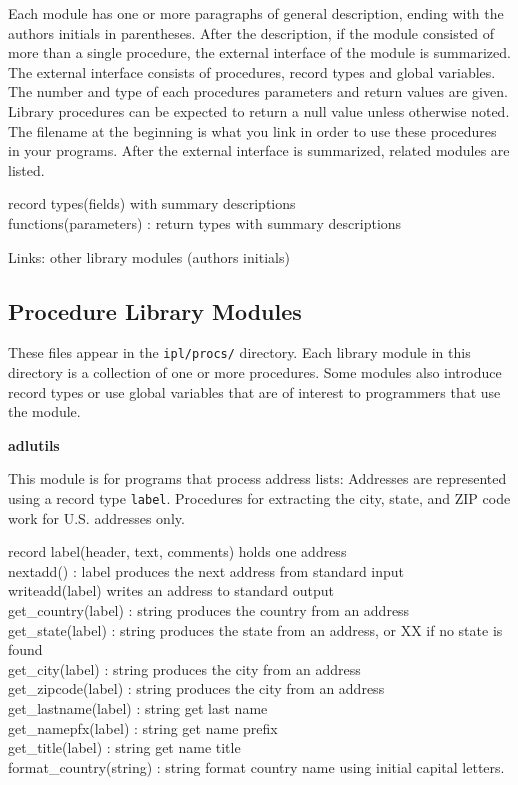 Each module has one or more paragraphs of general description, ending
with the authors{\textquotesingle} initials in parentheses. After the
description, if the module consisted of more than a single procedure,
the external interface of the module is summarized. The external
interface consists of procedures, record types and global variables.
The number and type of each procedure{\textquotesingle}s parameters and
return values are given. Library procedures can be expected to return a
null value unless otherwise noted. The filename at the beginning is
what you link in order to use these procedures in your
programs. After the external interface is summarized, related modules
are listed.

record types(fields) with summary descriptions\\
functions(parameters) : return types with summary descriptions

Links: other library modules (author{\textquotesingle}s initials)

\subsection{Procedure Library Modules}

These files appear in the \texttt{ipl/procs/} directory. Each library
module in this directory is a collection of one or more procedures.
Some modules also introduce record types or use global variables that
are of interest to programmers that use the module.

{\sffamily\bfseries
adlutils}

This module is for programs that process address lists: Addresses are
represented using a record type \texttt{label}. Procedures for
extracting the city, state, and ZIP code work for U.S. addresses only.

\textsf{record label(header, text, comments)} holds one address\\
\textsf{nextadd() : label} produces the next address from standard
input\\
\textsf{writeadd(label)} writes an address to standard output\\
\textsf{get\_country(label) : string} produces the country from an
address\\
\textsf{get\_state(label) : string} produces the state from an address,
or \textsf{{\textquotedbl}XX{\textquotedbl}} if no state is
found\\
\textsf{get\_city(label) : string} produces the city from an
address\\
\textsf{get\_zipcode(label) : string} produces the city from an
address\\
\textsf{get\_lastname(label) : string} get last name\\
\textsf{get\_namepfx(label) : string} get name prefix\\
\textsf{get\_title(label) : string} get name title\\
\textsf{format\_country(string) : string} format country name using
initial capital letters.

